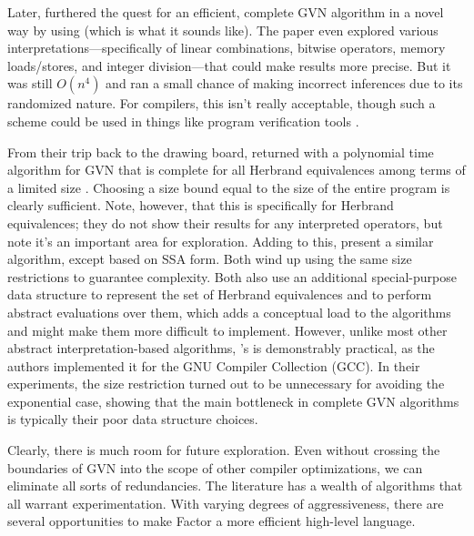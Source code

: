 Later, \citeauthor{Gulwani04} \autocite*{Gulwani04} furthered the quest for an
efficient, complete \gls{GVN} algorithm in a novel way by using
 (which is what it sounds like).  The paper
even explored various interpretations---specifically of linear combinations,
bitwise operators, memory loads/stores, and integer division---that could make
results more precise.  But it was still $O(n^4)$ and ran a small chance of
making incorrect inferences due to its randomized nature.  For compilers, this
isn't really acceptable, though such a scheme could be used in things like
program verification tools \autocite{Nie}.

From their trip back to the drawing board, \citeauthor{Gulwani07} returned with
a polynomial time algorithm for \gls{GVN} that is complete for all Herbrand
equivalences among terms of a limited size \autocite{Gulwani07}.  Choosing a
size bound equal to the size of the entire program is clearly sufficient.
Note, however, that this is specifically for Herbrand equivalences; they do not
show their results for any interpreted operators, but note it's an important
area for exploration.  Adding to this, \citeauthor{Nie} \autocite*{Nie} present
a similar algorithm, except based on \gls{SSA} form.  Both wind up using the
same size restrictions to guarantee complexity.  Both also use an additional
special-purpose data structure to represent the set of Herbrand equivalences
and to perform abstract evaluations over them, which adds a conceptual load to
the algorithms and might make them more difficult to implement.  However,
unlike most other abstract interpretation-based algorithms, \citeauthor{Nie}'s
is demonstrably practical, as the authors implemented it for the GNU Compiler
Collection (GCC).  In their experiments, the size restriction turned out to be
unnecessary for avoiding the exponential case, showing that the main bottleneck
in complete \gls{GVN} algorithms is typically their poor data structure
choices.

Clearly, there is much room for future exploration.  Even without crossing the
boundaries of \gls{GVN} into the scope of other compiler optimizations, we can
eliminate all sorts of redundancies.  The literature has a wealth of algorithms
that all warrant experimentation.  With varying degrees of aggressiveness,
there are several opportunities to make Factor a more efficient high-level
language.

